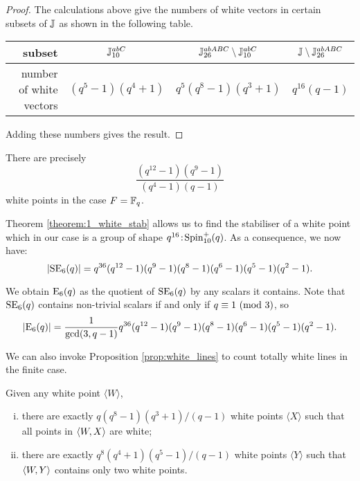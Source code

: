\begin{proof}
	The calculations above give the numbers of white vectors in certain subsets of $\mathbb{J}$ as
	shown in the following table.
	
	\begin{table}[h!]
	\begin{tabular}{r|c|c|c}
		subset & $\mathbb{J}_{10}^{abC}$ & $\mathbb{J}_{26}^{abABC}\setminus\mathbb{J}_{10}^{abC}$ & 
										$\mathbb{J}\setminus \mathbb{J}_{26}^{abABC}$ \\ \hline
		\rule{0pt}{10pt}number of white vectors & $(q^5-1)(q^4+1)$ & $q^5(q^8-1)(q^3+1)$ & 
										$q^{16}(q-1)$
	\end{tabular}
	\end{table}
	\noindent Adding these numbers gives the result. 
\end{proof}

\begin{corollary}
	There are precisely
	\begin{equation}
		\frac{(q^{12}-1) (q^9-1)}{(q^4-1)(q-1)} 
	\end{equation}
	white points in the case $F = \mathbb{F}_q$. 
\end{corollary}

Theorem \ref{theorem:1_white_stab} allows us to find the stabiliser of a white point which in our
case is a group of shape $q^{16}\mathord{{\;\!{:}\;\!}}\mathrm{Spin}_{10}^+(q)$. As a
 consequence, we now have:
\begin{equation}
	|\mathrm{SE}_6(q)| = q^{36}(q^{12}-1)(q^9-1)(q^8-1)(q^6-1)(q^5-1)(q^2-1).
\end{equation}

We obtain $\mathord{\mathrm{E}}_6(q)$ as the quotient of $\mathrm{SE}_6(q)$ by any scalars it contains.
Note that $\mathrm{SE}_6(q)$ contains non-trivial scalars if and only if $q \equiv 1 \ (\mathrm{mod}\ 3)$, so
\begin{equation}
	|\mathord{\mathrm{E}}_6(q)| = \frac{1}{\gcd(3,q-1)} 
				q^{36}(q^{12}-1)(q^9-1)(q^8-1)(q^6-1)(q^5-1)(q^2-1).				
\end{equation}

We can also invoke Proposition \ref{prop:white_lines} to count totally white lines in the finite
case.

\begin{proposition}
	Given any white point $\langle W \rangle$, 
	\begin{enumerate}[(i)]
		\item there are exactly $q(q^8-1)(q^3+1)/(q-1)$ white points $\langle X \rangle$ such
		that all points in $\langle W, X \rangle$ are white;
		\item there are exactly $q^8(q^4+1)(q^5-1)/(q-1)$ white points $\langle Y \rangle$ such
		that $\langle W, Y \rangle$ contains only two white points. 
	\end{enumerate}
\end{proposition}

